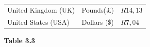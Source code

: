 \begin{enumerate}[noitemsep, label=\textbf{\arabic*}. ]
{\begin{center}
\begin{xtabular*}{\mytablewidth}[t]{|p{10\mystarwidth}|p{10\mystarwidth}|p{10\mystarwidth}|}
    
        United Kingdom (UK) &
    
    
        Pounds(£) &
    
    
        \begin{math}R14,13\end{math}%
     \tabularnewline{}
    
    
        United States (USA) &
    
    
        Dollars (\$) &
    
    
        \begin{math}R7,04\end{math}%
     \tabularnewline{}
    \end{xtabular*}
      \end{center}
    \begin{center}{\small\bfseries Table 3.3}\end{center}
    
    \addtocounter{footnote}{-0}
    
}
\end{enumerate}
